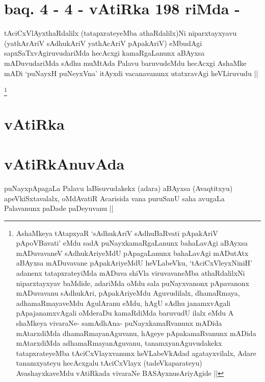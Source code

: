 
\section*{baq. 4 - 4 - vAtiRka 198 riMda -}


\begin{artha}
tAciCxVlAyxthaRdalilx (tatapxrateyeMba athaRdalilx)Ni niparxtayxyavu
(yathArAriV sAdhukAriV yathAcAriV pApakAriV) eMbudAgi
sapxSaTxvAgiruvudariMda hecAcxgi kamaRgaLanunx aBAyxsa mADuvudariMda
sAdhu muMtAda Palavu baruvudeMdu hecAcxgi AshaMke mADi `puNayxH
puNeyxVna' itAyxdi vacanavanunx utatxravAgi heVLiruvudu ||
\end{artha}


\footnote{AshaMkeya tAtapxyaR `sAdhukAriV sAdhuBaRvati pApakAriV
  pApoVBavati' eMdu sadA puNayxkamaRgaLanunx bahaLavAgi aBAyxsa
  mADuvavaneV sAdhukAriyeMdU pApagaLanunx bahaLavAgi mADutAtx aBAyxsa
  mADuvavane pApakAriyeMdU heVLabeVku, `tAciCxVleyxNiniH' adanenx
  tatapxrateyiMda mADuva shiVla viruvavaneMba athaRdalilxNi
  niparxtayxyav baMdide, adariMda oMdu sala puNayxvanonx pApavanonx
  mADuvavanu sAdhukAri, pApakAriyeMdu Aguvudilalx, dhamaRmaya,
  adhamaRmayaveMdu AgulAranu eMdu, hAgU sAdhu janamxvAgali
  pApajanamxvAgali oMderaDu kamaRdiMda baruvudU ilalx eMdu A shaMkeya
  vivaraNe- samAdhAna- puNayxkamaRvanunx mADida mAtarxdiMda
  dhamaRmayanAguvanu, hAgeye pApakamaRvanunx mADida mAtarxdiMda
  adhamaRmayanAguvanu, tanamxyanAguvudakekx tatapxrateyeMba
  tAciCxVlayxvanunx heVLabeVkAdad agatayxvilalx, Adare tanamxyateyu
  hecAcxgalu tAciCxVlayx (tadeVkaparateyu) AvashayxkaveMdu vAtiRkada
  vivaraNe BASAyxnusAriyAgide ||}\stext

\section*{vAtiRka}

\section*{vAtiRkAnuvAda}

\begin{artha}
puNayxpApagaLa Palavu laBisuvudakekx (adara) aBAyxsa (Avaqtitxyu)
apeVkiSxtavalalx, oMdAvatiR Acarisida vana puruSanU saha avugaLa
Palavanunx paDade paDeyuvanu ||
\end{artha}

